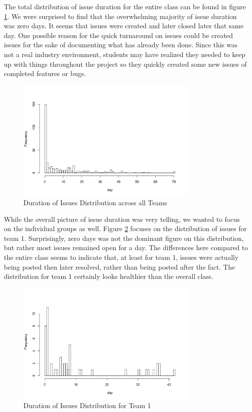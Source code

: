 \documentclass[conference]{IEEEtran}
\begin{document}
The total distribution of issue duration for the entire class can be found in figure \ref{issue_duration_total}. We were surprised to find that the overwhelming majority of issue duration was zero days. It seems that issues were created and later closed later that same day. One possible reason for the quick turnaround on issues could be created issues for the sake of documenting what has already been done. Since this was not a real industry environment, students may have realized they needed to keep up with things throughout the project so they quickly created some new issues of completed features or bugs. 

\begin{figure}[H]
    \centering
    \includegraphics[width=9cm]{../AprilProject/pic/distribution/issue_duration_distribution_total.png}
    \caption{Duration of Issues Distribution across all Teams}
    \label{issue_duration_total}
\end{figure}

While the overall picture of issue duration was very telling, we wanted to focus on the individual groups as well. Figure \ref{issue_duration_team1} focuses on the distribution of issues for team 1. Surprisingly, zero days was not the dominant figure on this distribution, but rather most issues remained open for a day. The differences here compared to the entire class seems to indicate that, at least for team 1, issues were actually being posted then later resolved, rather than being posted after the fact. The distribution for team 1 certainly looks healthier than the overall class.

\begin{figure}[H]
    \centering
    \includegraphics[width=9cm]{../AprilProject/pic/distribution/issue_duration_distribution_team1.png}
    \caption{Duration of Issues Distribution for Team 1}
    \label{issue_duration_team1}
\end{figure}
\end{document}
